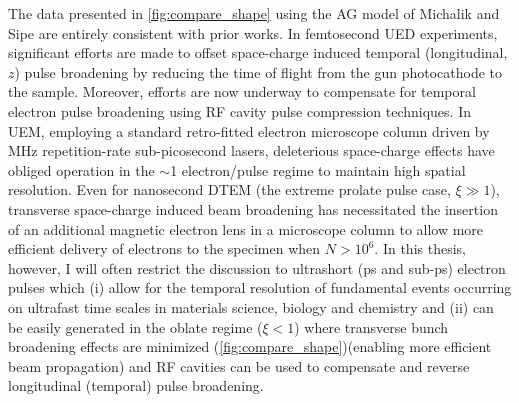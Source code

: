 The data presented in \ref{fig:compare_shape} using the AG model of Michalik and Sipe \cite{michalik_analytic_2006} are entirely consistent with prior works.\cite{reed_femtosecond_2006,siwick_ultrafast_2002}
In femtosecond UED experiments, significant efforts are made to offset space-charge induced temporal (longitudinal, $z$) pulse broadening by reducing the time of flight from the gun photocathode to the sample.\cite{siwick_ultrafast_2002,reed_evolution_2009}
Moreover, efforts are now underway to compensate for temporal electron pulse broadening using RF cavity pulse compression techniques.\cite{oudheusden_electron_2007}
In UEM, employing a standard retro-fitted electron microscope column driven by MHz repetition-rate sub-picosecond lasers,\cite{lobastov_four-dimensional_2005} deleterious space-charge effects have obliged operation in the $\sim$1 electron/pulse regime to maintain high spatial resolution.
Even for nanosecond DTEM (the extreme prolate pulse case, $\xi \gg 1 $), transverse space-charge induced beam broadening has necessitated the insertion of an additional magnetic electron lens in a microscope column to allow more efficient delivery of electrons to the specimen when $ N > 10^{6} $.\cite{lagrange_nanosecond_2008}
In this thesis, however, I will often restrict the discussion to ultrashort (ps and sub-ps) electron pulses which (i) allow for the temporal resolution of fundamental events occurring on ultrafast time scales in materials science, biology and chemistry \cite{king_ultrafast_2005} and (ii) can be easily generated in the oblate regime ($ \xi < 1 $) where transverse bunch broadening effects are minimized (\ref{fig:compare_shape})(enabling more efficient beam propagation) and RF cavities can be used to compensate and reverse longitudinal (temporal) pulse broadening.\cite{veisz_hybrid_2007}

